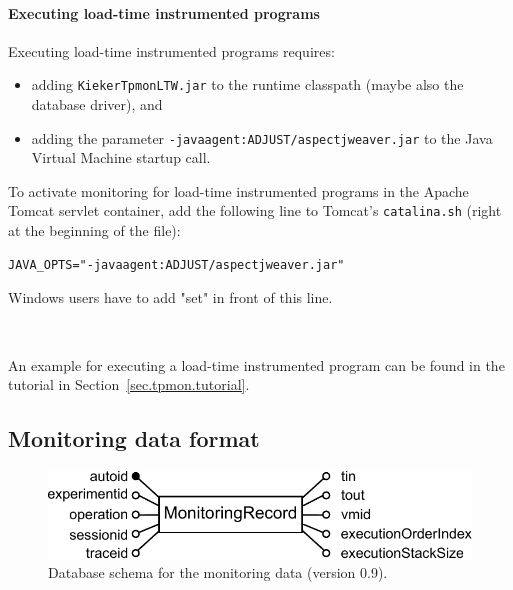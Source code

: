 \documentclass[a4paper,12pt]{scrartcl}
\begin{document}
\paragraph{Executing load-time instrumented programs}
Executing load-time instrumented programs requires:
\begin{itemize}
\item adding \texttt{KiekerTpmonLTW.jar} to the runtime classpath (maybe also the database driver), and
\item adding the parameter \texttt{-javaagent:ADJUST/aspectjweaver.jar} to the Java Virtual Machine startup call.
\end{itemize}

To activate monitoring for load-time instrumented programs in the Apache Tomcat servlet container, add the following line to Tomcat's \texttt{catalina.sh} (right at the beginning of the file):
\begin{lstlisting}[caption={}]
JAVA_OPTS="-javaagent:ADJUST/aspectjweaver.jar"
\end{lstlisting}
Windows users have to add "set" in front of this line.

\

An example for executing a load-time instrumented program can be found in the tutorial in Section~\ref{sec.tpmon.tutorial}.

\subsection{Monitoring data format}\label{sec.monitoring.data.format}

\begin{figure}
 \centering
 \includegraphics[width=0.8\columnwidth]{08-05-06-monitoringDataFormat}
 \caption{Database schema for the monitoring data (version 0.9).}
 \label{databaseSchema}
\end{figure}
\end{document}
